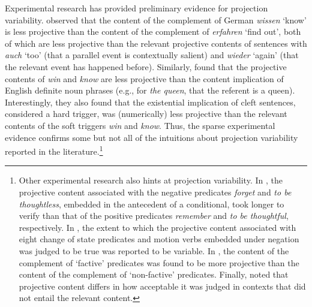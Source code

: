 \documentclass[11pt,fleqn]{article}
\newcommand{\6}{\mbox{$[\hspace*{-.6mm}[$}}
\newcommand{\9}{\mbox{$]\hspace*{-.6mm}]$}}
\begin{document}
Experimental research has provided preliminary evidence for projection variability. \citet{xue-onea11} observed that the content of the complement of German {\em wissen} `know' is less projective than the content of the complement of {\em erfahren} `find out', both of which are less projective than the relevant projective contents of sentences with {\em auch} `too' (that a parallel event is contextually salient) and {\em wieder} `again' (that the relevant event has happened before). Similarly, \citet{smith-hall11} found that the projective contents of {\em win} and {\em know} are less projective than the content implication of English definite noun phrases (e.g., for {\em the queen}, that the referent is a queen). Interestingly, they also found that the existential implication of cleft sentences, considered a hard trigger, was (numerically) less projective than the relevant contents of the soft triggers {\em win} and {\em know}. Thus, the sparse experimental evidence confirms some but not all of the intuitions about projection variability reported in the literature.\footnote{Other experimental research also hints at projection variability. In \citealt{just-clark1973}, the projective content associated with the negative predicates {\em forget} and {\em to be thoughtless}, embedded in the antecedent of a conditional, took longer to verify than that of the positive predicates {\em remember} and {\em to be thoughtful}, respectively. In \citealt{harris1974}, the extent to which the projective content associated with eight change of state predicates and motion verbs embedded under negation was judged to be true was reported to be variable. In \citealt{harris1974b}, the content of the complement of `factive' predicates was found to be more projective than the content of the complement of `non-factive' predicates. Finally, \citet{tiemann-etal11} noted that projective content differs in how acceptable it was judged in contexts that did not entail the relevant content.}
\end{document}
